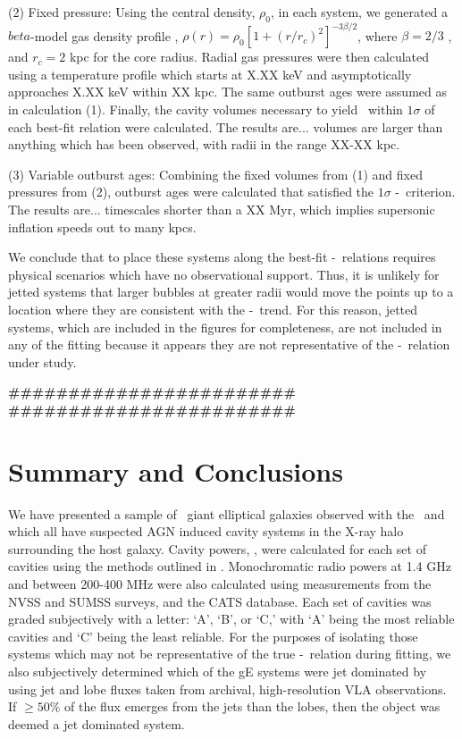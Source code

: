 \documentclass{emulateapj}
\begin{document}
(2) Fixed pressure: Using the central density, $\rho_0$, in each
system, we generated a $beta$-model gas density profile
\citep{betamodel}, $\rho(r) = \rho_0 [1+(r/r_c)^2]^{-3\beta/2}$, where
$\beta = 2/3$ \citep{1984ApJ...276...38J}, and $r_c = 2$ kpc for the
core radius. Radial gas pressures were then calculated using a
temperature profile which starts at X.XX keV and asymptotically
approaches X.XX keV within XX kpc. The same outburst ages were assumed
as in calculation (1). Finally, the cavity volumes necessary to yield
\pcav\ within $1\sigma$ of each best-fit relation were calculated. The
results are... volumes are larger than anything which has been
observed, with radii in the range XX-XX kpc.

(3) Variable outburst ages: Combining the fixed volumes from (1) and
fixed pressures from (2), outburst ages were calculated that satisfied
the $1\sigma$ \pcav-\prad\ criterion. The results are... timescales
shorter than a XX Myr, which implies supersonic inflation speeds out
to many kpcs.

We conclude that to place these systems along the best-fit
\pcav-\prad\ relations requires physical scenarios which have no
observational support. Thus, it is unlikely for jetted systems that
larger bubbles at greater radii would move the points up to a location
where they are consistent with the \pcav-\prad\ trend. For this
reason, jetted systems, which are included in the figures for
completeness, are not included in any of the fitting because it
appears they are not representative of the \pjet-\prad\ relation under
study.

{\bfseries{\#\#\#\#\#\#\#\#\#\#\#\#\#\#\#\#\#\#\#\#\#\#\#\#}}\\
{\bfseries{\#\#\#\#\#\#\#\#\#\#\#\#\#\#\#\#\#\#\#\#\#\#\#\#}}\\

\section{Summary and Conclusions}
\label{sec:summary}

We have presented a sample of \samp\ giant elliptical galaxies
observed with the \cxo\ and which all have suspected AGN induced
cavity systems in the X-ray halo surrounding the host galaxy. Cavity
powers, \pcav, were calculated for each set of cavities using the
methods outlined in \citet{rafferty06}. Monochromatic radio powers at
1.4 GHz and between 200-400 MHz were also calculated using
measurements from the NVSS and SUMSS surveys, and the CATS database.
Each set of cavities was graded subjectively with a letter: `A', `B',
or `C,' with `A' being the most reliable cavities and `C' being the
least reliable. For the purposes of isolating those systems which may
not be representative of the true \pcav-\prad\ relation during
fitting, we also subjectively determined which of the gE systems were
jet dominated by using jet and lobe fluxes taken from archival,
high-resolution VLA observations. If $\ge 50\%$ of the flux emerges
from the jets than the lobes, then the object was deemed a jet
dominated system.
\end{document}
